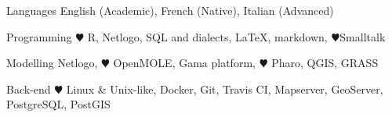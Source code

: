 

\begin{cvskills}

  \cvskill
  {Languages} %
  {English (Academic), French (Native), Italian (Advanced) } %

  \cvskill
    {Programming} %
    {{\color{red} $\varheartsuit$} R, Netlogo, SQL and dialects, \LaTeX, markdown, {\color{red} $\varheartsuit$}Smalltalk} %

  \cvskill
    {Modelling} %
    {Netlogo, {\color{red} $\varheartsuit$} OpenMOLE, Gama platform,
  {\color{red} $\varheartsuit$} Pharo, QGIS, GRASS} %

  \cvskill
    {Back-end} %
    {{\color{red} $\varheartsuit$} Linux \& Unix-like, Docker, Git, Travis CI, Mapserver, GeoServer, PostgreSQL, PostGIS} %

\end{cvskills}
